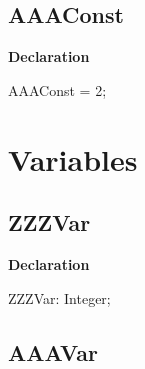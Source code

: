 \documentclass{report}
\newif\ifpdf
\begin{document}
\subsection*{AAAConst}
\fi
\label{ok_sorting-AAAConst}
\begin{list}{}{
\setlength{\itemindent}{0cm}
\setlength{\listparindent}{0cm}
\setlength{\leftmargin}{\evensidemargin}
\addtolength{\leftmargin}{\tmplength}
\settowidth{\labelsep}{X}
\addtolength{\leftmargin}{\labelsep}
\setlength{\labelwidth}{\tmplength}
}
\item[\textbf{Declaration}\hfill]
\ifpdf
\begin{flushleft}
\fi
\begin{ttfamily}
AAAConst = 2;\end{ttfamily}

\ifpdf
\end{flushleft}
\fi

\end{list}
\section{Variables}
\ifpdf
\subsection*{\large{\textbf{ZZZVar}}\normalsize\hspace{1ex}\hrulefill}
\else
\subsection*{ZZZVar}
\fi
\label{ok_sorting-ZZZVar}
\begin{list}{}{
\setlength{\itemindent}{0cm}
\setlength{\listparindent}{0cm}
\setlength{\leftmargin}{\evensidemargin}
\addtolength{\leftmargin}{\tmplength}
\settowidth{\labelsep}{X}
\addtolength{\leftmargin}{\labelsep}
\setlength{\labelwidth}{\tmplength}
}
\item[\textbf{Declaration}\hfill]
\ifpdf
\begin{flushleft}
\fi
\begin{ttfamily}
ZZZVar: Integer;\end{ttfamily}

\ifpdf
\end{flushleft}
\fi

\end{list}
\ifpdf
\subsection*{\large{\textbf{AAAVar}}\normalsize\hspace{1ex}\hrulefill}
\else
\end{document}
